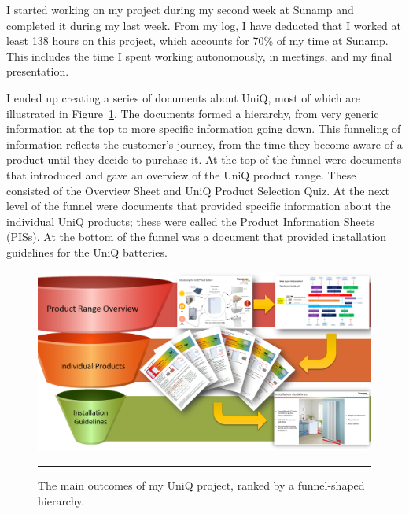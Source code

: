 
I started working on my project during my second week at Sunamp and completed it during my last week.
From my log, I have deducted that I worked at least 138 hours on this project, which accounts for 70\% of my time at Sunamp.
This includes the time I spent working autonomously, in meetings, and my final presentation.

I ended up creating a series of documents about UniQ, most of which are illustrated in Figure~\ref{funnel}.
The documents formed a hierarchy, from very generic information at the top to more specific information going down.
This funneling of information reflects the customer's journey, from the time they become aware of a product until they decide to purchase it.
At the top of the funnel were documents that introduced and gave an overview of the UniQ product range.
These consisted of the Overview Sheet and UniQ Product Selection Quiz.
At the next level of the funnel were documents that provided specific information about the individual UniQ products; these were called the Product Information Sheets (PISs).
At the bottom of the funnel was a document that provided installation guidelines for the UniQ batteries.


\begin{figure}[htbp]
	\centering
	\includegraphics[width=\textwidth]{figures/Funnel.PNG}
	\rule{\textwidth}{0.5pt} %
	\caption{The main outcomes of my UniQ project, ranked by a funnel-shaped hierarchy.}
	\label{funnel}
\end{figure}


